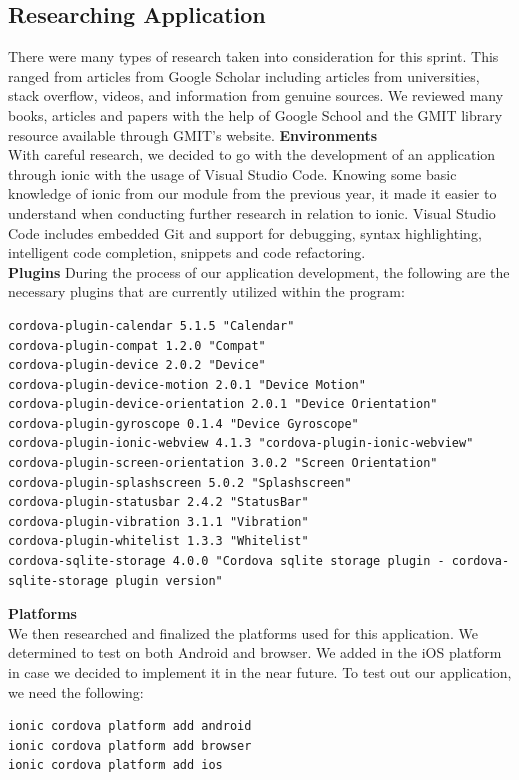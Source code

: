 \documentclass[a4paper,12pt]{report}
\begin{document}
\subsection{Researching Application}
There were many types of research taken into consideration for this sprint. This ranged from articles from Google Scholar including articles from universities, stack overflow, videos, and information from genuine sources. We reviewed many books, articles and papers with the help of Google School and the GMIT library resource available through GMIT's website.
\newpage
\textbf{Environments}\\
With careful research, we decided to go with the development of an application through ionic with the usage of Visual Studio Code. Knowing some basic knowledge of ionic from our module from the previous year, it made it easier to understand when conducting further research in relation to ionic. Visual Studio Code includes embedded Git and support for debugging, syntax highlighting, intelligent code completion, snippets and code refactoring.\\
\textbf{Plugins}
During the process of our application development, the following are the necessary plugins that are currently utilized within the program:

\begin{lstlisting}
cordova-plugin-calendar 5.1.5 "Calendar"
cordova-plugin-compat 1.2.0 "Compat"
cordova-plugin-device 2.0.2 "Device"
cordova-plugin-device-motion 2.0.1 "Device Motion"
cordova-plugin-device-orientation 2.0.1 "Device Orientation"
cordova-plugin-gyroscope 0.1.4 "Device Gyroscope"
cordova-plugin-ionic-webview 4.1.3 "cordova-plugin-ionic-webview"
cordova-plugin-screen-orientation 3.0.2 "Screen Orientation"
cordova-plugin-splashscreen 5.0.2 "Splashscreen"
cordova-plugin-statusbar 2.4.2 "StatusBar"
cordova-plugin-vibration 3.1.1 "Vibration"
cordova-plugin-whitelist 1.3.3 "Whitelist"
cordova-sqlite-storage 4.0.0 "Cordova sqlite storage plugin - cordova-sqlite-storage plugin version"
\end{lstlisting} 
\textbf{Platforms}
\\
We then researched and finalized the platforms used for this application. We determined to test on both Android and browser. We added in the iOS platform in case we decided to implement it in the near future. To test out our application, we need the following:
\begin{lstlisting}
ionic cordova platform add android
ionic cordova platform add browser
ionic cordova platform add ios
\end{lstlisting}
\end{document}
